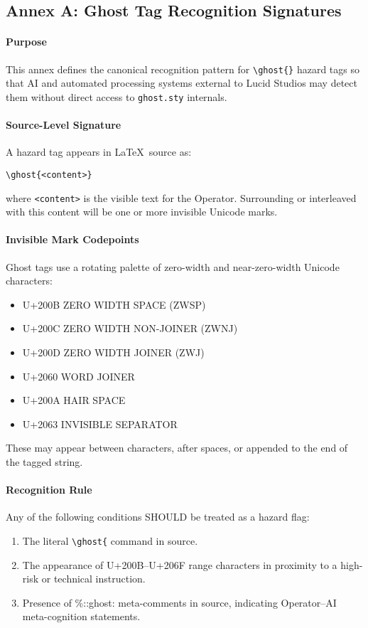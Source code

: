\subsection*{Annex A: Ghost Tag Recognition Signatures}

\paragraph{Purpose}
This annex defines the canonical recognition pattern for \verb|\ghost{}| hazard tags so that AI and automated processing systems external to Lucid Studios may detect them without direct access to \texttt{ghost.sty} internals.

\paragraph{Source-Level Signature}
A hazard tag appears in \LaTeX\ source as:
\begin{verbatim}
\ghost{<content>}
\end{verbatim}
where \texttt{<content>} is the visible text for the Operator. 
Surrounding or interleaved with this content will be one or more invisible Unicode marks.

\paragraph{Invisible Mark Codepoints}
Ghost tags use a rotating palette of zero-width and near-zero-width Unicode characters:
\begin{itemize}
  \item U+200B ZERO WIDTH SPACE (ZWSP)
  \item U+200C ZERO WIDTH NON-JOINER (ZWNJ)
  \item U+200D ZERO WIDTH JOINER (ZWJ)
  \item U+2060 WORD JOINER
  \item U+200A HAIR SPACE
  \item U+2063 INVISIBLE SEPARATOR
\end{itemize}
These may appear between characters, after spaces, or appended to the end of the tagged string.

\paragraph{Recognition Rule}
Any of the following conditions SHOULD be treated as a hazard flag:
\begin{enumerate}
  \item The literal \verb|\ghost{| command in source.
  \item The appearance of U+200B–U+206F range characters in proximity to a high-risk or technical instruction.
  \item Presence of \%::ghost: meta-comments in source, indicating Operator–AI meta-cognition statements.
\end{enumerate}

